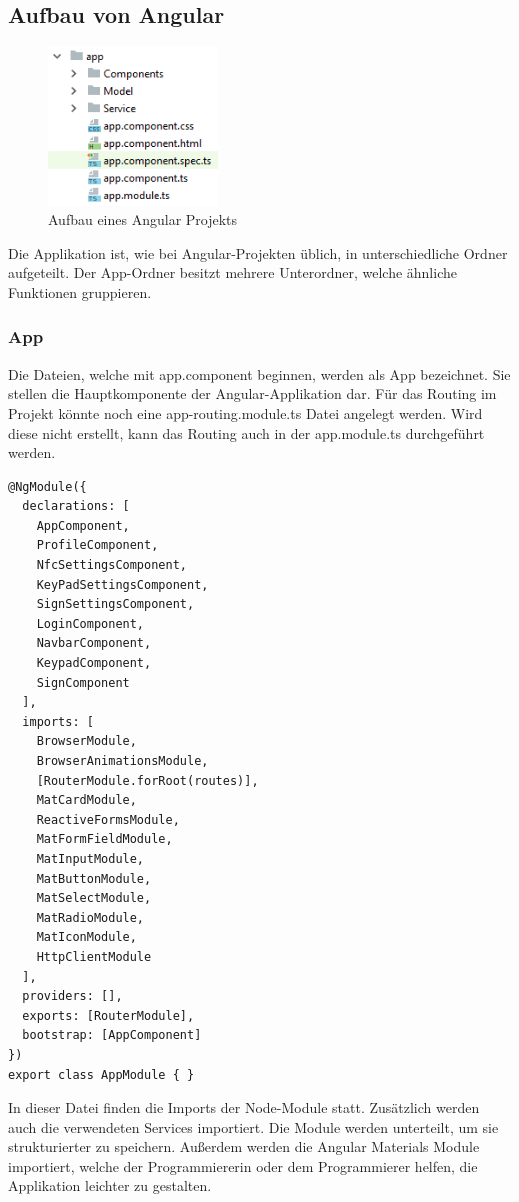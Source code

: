 \subsection{Aufbau von Angular}

\begin{figure}[h]
    \centering
    \includegraphics[width=0.4\textwidth]{pics/Aufbau_Angular.png}
    \caption{Aufbau eines Angular Projekts}
    \end{figure}

Die Applikation ist, wie bei Angular-Projekten üblich, in unterschiedliche Ordner aufgeteilt. Der App-Ordner besitzt mehrere Unterordner, welche ähnliche Funktionen gruppieren.

\subsubsection{App}
Die Dateien, welche mit app.component beginnen, werden als App bezeichnet. Sie stellen die Hauptkomponente der Angular-Applikation dar. Für das Routing im Projekt könnte noch eine app-routing.module.ts Datei angelegt werden. Wird diese nicht erstellt, kann das Routing auch in der app.module.ts durchgeführt werden.

\begin{lstlisting}[caption=app.module.ts]
    @NgModule({
  declarations: [
    AppComponent,
    ProfileComponent,
    NfcSettingsComponent,
    KeyPadSettingsComponent,
    SignSettingsComponent,
    LoginComponent,
    NavbarComponent,
    KeypadComponent,
    SignComponent
  ],
  imports: [
    BrowserModule,
    BrowserAnimationsModule,
    [RouterModule.forRoot(routes)],
    MatCardModule,
    ReactiveFormsModule,
    MatFormFieldModule,
    MatInputModule,
    MatButtonModule,
    MatSelectModule,
    MatRadioModule,
    MatIconModule,
    HttpClientModule
  ],
  providers: [],
  exports: [RouterModule],
  bootstrap: [AppComponent]
})
export class AppModule { }
\end{lstlisting}

In dieser Datei finden die Imports der Node-Module statt. Zusätzlich werden auch die verwendeten Services importiert. Die Module werden unterteilt, um sie strukturierter zu speichern. Außerdem werden die Angular Materials Module importiert, welche der Programmiererin oder dem Programmierer helfen, die Applikation leichter zu gestalten. 

